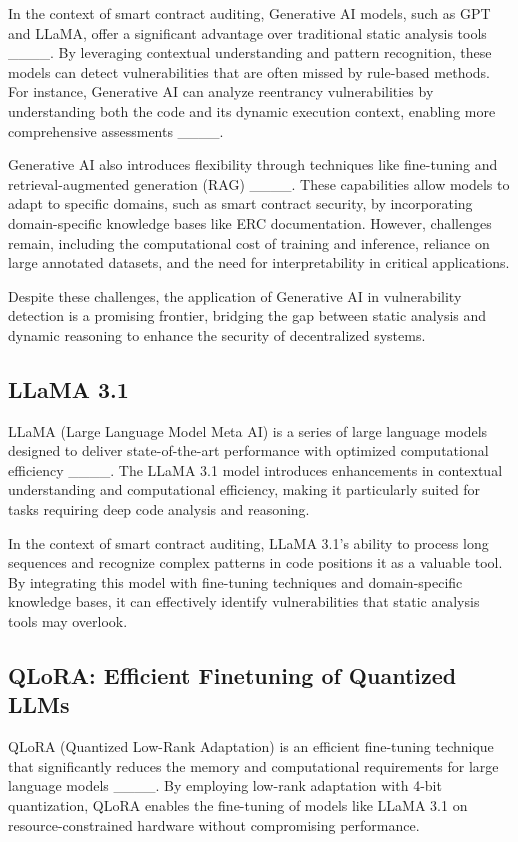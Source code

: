 In the context of smart contract auditing, Generative AI models, such as GPT and LLaMA, offer a significant advantage over traditional static analysis tools ____. By leveraging contextual understanding and pattern recognition, these models can detect vulnerabilities that are often missed by rule-based methods. For instance, Generative AI can analyze reentrancy vulnerabilities by understanding both the code and its dynamic execution context, enabling more comprehensive assessments ____.

Generative AI also introduces flexibility through techniques like fine-tuning and retrieval-augmented generation (RAG) ____. These capabilities allow models to adapt to specific domains, such as smart contract security, by incorporating domain-specific knowledge bases like ERC documentation. However, challenges remain, including the computational cost of training and inference, reliance on large annotated datasets, and the need for interpretability in critical applications.

Despite these challenges, the application of Generative AI in vulnerability detection is a promising frontier, bridging the gap between static analysis and dynamic reasoning to enhance the security of decentralized systems.

\subsection{LLaMA 3.1}
LLaMA (Large Language Model Meta AI) is a series of large language models designed to deliver state-of-the-art performance with optimized computational efficiency ____. The LLaMA 3.1 model introduces enhancements in contextual understanding and computational efficiency, making it particularly suited for tasks requiring deep code analysis and reasoning.

In the context of smart contract auditing, LLaMA 3.1's ability to process long sequences and recognize complex patterns in code positions it as a valuable tool. By integrating this model with fine-tuning techniques and domain-specific knowledge bases, it can effectively identify vulnerabilities that static analysis tools may overlook.

\subsection{QLoRA: Efficient Finetuning of Quantized LLMs}
QLoRA (Quantized Low-Rank Adaptation) is an efficient fine-tuning technique that significantly reduces the memory and computational requirements for large language models ____. By employing low-rank adaptation with 4-bit quantization, QLoRA enables the fine-tuning of models like LLaMA 3.1 on resource-constrained hardware without compromising performance.

